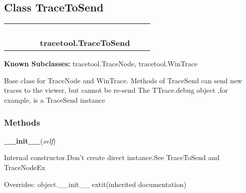 

\subsection{Class TraceToSend}

    \label{tracetool:TraceToSend}
\begin{tabular}{cccccccc}
\multicolumn{2}{r}{\settowidth{\BCL}{object}\multirow{2}{\BCL}{object}}
&&
&&
  \\\cline{3-3}
  &&\multicolumn{1}{c|}{}
&&
&&
  \\
\multicolumn{4}{r}{\settowidth{\BCL}{tracetool.TraceNodeBase}\multirow{2}{\BCL}{tracetool.TraceNodeBase}}
&&
  \\\cline{5-5}
  &&&&\multicolumn{1}{c|}{}
&&
  \\
&&&&\multicolumn{2}{l}{\textbf{tracetool.TraceToSend}}
\end{tabular}

\textbf{Known Subclasses:}
tracetool.TraceNode,
    tracetool.WinTrace

Base class for TraceNode and WinTrace. Methods of TraceSend can send new 
traces to the viewer, but cannot be re-send The TTrace.debug object ,for 
example, is a TraceSend instance



  \subsubsection{Methods}

    \vspace{0.5ex}

\hspace{.8\funcindent}\begin{boxedminipage}{\funcwidth}

    \raggedright \textbf{\_\_init\_\_}(\textit{self})

\setlength{\parskip}{2ex}
    Internal constructor.Don't create direct instance.See TraceToSend and 
    TraceNodeEx

\setlength{\parskip}{1ex}
      Overrides: object.\_\_init\_\_ 	extit{(inherited documentation)}

    \end{boxedminipage}

